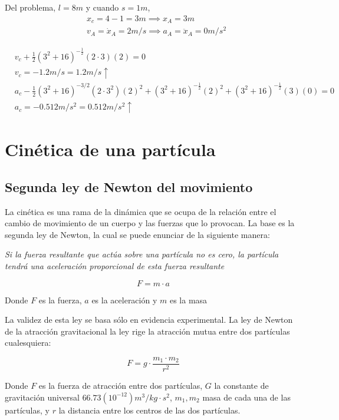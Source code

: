 Del problema, $l=8m$ y cuando $s=1m$,
\begin{align*}
    &x_c=4-1=3m\implies x_A=3m\\    &v_A=\dot{x}_A=2m/s\implies a_A=\ddot{x}_A=0m/s^2
\end{align*}

\begin{align*}
    &v_c+\frac{1}{2}\left(3^2+16\right)^{-\frac{1}{2}}(2\cdot 3)(2)=0\\
    &v_c=-1.2m/s=1.2m/s\uparrow \\
    &a_c-\frac{1}{2}\left(3^2+16\right)^{-3/2}\left(2\cdot 3^2\right)(2)^2+\left(3^2+16\right)^{-\frac{1}{2}}(2)^2+\left(3^2+16\right)^{-\frac{1}{2}}(3)(0)=0\\
    &a_c=-0.512m/s^2=0.512m/s^2 \uparrow
\end{align*}

\section{Cinética de una partícula}
\subsection{Segunda ley de Newton del movimiento}
La cinética es una rama de la dinámica que se ocupa de la relación entre el cambio de movimiento de un cuerpo y las fuerzas que lo provocan. La base es la segunda ley de Newton, la cual se puede enunciar de la siguiente manera: 

\emph{Si la fuerza resultante que actúa sobre una partícula no es cero, la partícula tendrá una aceleración proporcional de esta fuerza resultante}

\begin{equation}
    F=m\cdot a
\end{equation}

Donde $F$ es la fuerza, $a$ es la aceleración y $m$ es la masa

La validez de esta ley se basa sólo en evidencia experimental. La ley de Newton de la atracción gravitacional la ley rige la atracción mutua entre dos partículas cualesquiera: 

\begin{equation}
    F=g\cdot \frac{m_1\cdot m_2}{r^2}
\end{equation}

Donde $F$ es la fuerza de atracción entre dos partículas, $G$ la constante de gravitación universal $66.73\left(10^{-12}\right)m^3/kg\cdot s^2$, $m_1,m_2$ masa de cada una de las partículas, y $r$ la distancia entre los centros de las dos partículas.

